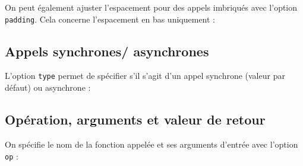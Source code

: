 \documentclass[a4paper,11pt]{report}
\newcommand{\inputTikZ}[1]{%
  }%
\newcommand{\inputTikZ}[1]{%
    \texttt{[image: fig/\#1.pdf]}%
  }%
\begin{document}
\medskip

On peut également ajuster l'espacement pour des appels imbriqués avec l'option {\tt padding}. Cela concerne l'espacement en bas uniquement :

\medskip

\begin{minipage}{0.5\textwidth}

\end{minipage}
\begin{minipage}{0.5\textwidth}
\begin{center}
\inputTikZ{figure71}
\end{center}
\end{minipage}

\subsection{Appels synchrones/ asynchrones}\label{ss.callsync}

L'option {\tt type} permet de spécifier s'il s'agit d'un appel synchrone (valeur par défaut) ou asynchrone :

\medskip

\begin{minipage}{0.5\textwidth}

\end{minipage}
\begin{minipage}{0.5\textwidth}
\begin{center}
\inputTikZ{figure72}
\end{center}
\end{minipage}

\subsection{Opération, arguments et valeur de retour}\label{ss.callop}

On spécifie le nom de la fonction appelée et ses arguments d'entrée avec l'option {\tt op} :

\medskip

\begin{minipage}{0.5\textwidth}

\end{minipage}
\begin{minipage}{0.5\textwidth}
\begin{center}
\inputTikZ{figure73}
\end{center}
\end{minipage}

\medskip
\end{document}
